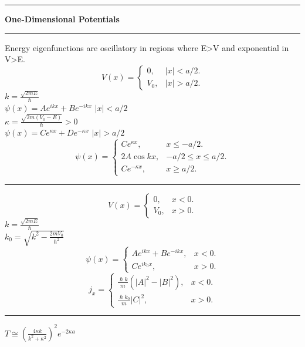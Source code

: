 \documentclass[0pt]{report}
\begin{document}
\begin{multicols}{3}
\begin{flushleft}
\noindent\rule[0.5ex]{\linewidth}{1pt}
\textbf{One-Dimensional Potentials}\\
\noindent\rule[0.5ex]{\linewidth}{.25pt}
Energy eigenfunctions are oscillatory in regions where E>V and exponential in V>E.\\
\begin{equation*}
  V(x)=\begin{cases}
    0, & \text{$|x|<a/2$}.\\
    V_0, & \text{$|x|>a/2$}.
  \end{cases}
\end{equation*}
$k=\frac{\sqrt{2mE}}{\hslash}$\\
$\psi(x)=Ae^{ikx}+Be^{-ikx}$ $|x|<a/2$\\
$\kappa=\frac{\sqrt{2m(V_0-E)}}{\hslash}>0$\\
$\psi(x)=Ce^{\kappa x}+De^{-\kappa x}$ $|x|>a/2$\\
\begin{equation*}
  \psi(x)=\begin{cases}
    Ce^{\kappa x}, & \text{$x\leq -a/2$}.\\
    2A\cos kx, & \text{$-a/2\leq x\leq a/2$}.\\
    Ce^{-\kappa x}, & \text{$x\geq a/2$}.
  \end{cases}
\end{equation*}

\noindent\rule[0.5ex]{\linewidth}{.25pt}
\begin{equation*}
  V(x)=\begin{cases}
    0, & \text{$x<0$}.\\
    V_0, & \text{$x>0$}.
  \end{cases}
\end{equation*}
$k=\frac{\sqrt{2mE}}{\hslash}$\\
$k_0=\sqrt{k^2-\frac{2mV_0}{\hslash^2}}$
\begin{equation*}
  \psi(x)=\begin{cases}
    Ae^{ikx}+Be^{-ikx}, & \text{$x<0$}.\\
    Ce^{ik_0x}, & \text{$x>0$}.
  \end{cases}
\end{equation*}
\begin{equation*}
  j_x=\begin{cases}
    \frac{\hslash k}{m}(|A|^2-|B|^2), & \text{$x<0$}.\\
    \frac{\hslash k_0}{m}|C|^2, & \text{$x>0$}.
  \end{cases}
\end{equation*}
\noindent\rule[0.5ex]{\linewidth}{.25pt}
$T\cong(\frac{4\kappa k}{k^2+\kappa^2})^2e^{-2\kappa a}$
\end{flushleft}
\end{multicols}
\end{document}
